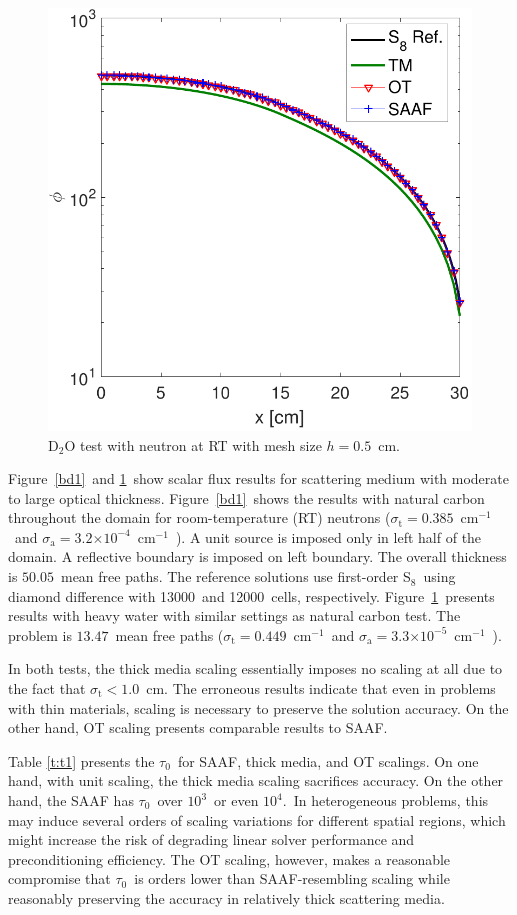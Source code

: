 \documentclass[review]{elsarticle}
\newcommand{\st}{\sigma_\mathrm{t}}
\newcommand{\e}[1]{\ensuremath{\times 10^{#1}}}
\newcommand{\siga}{\sigma_\mathrm{a}}
\newcommand{\icm}{cm$^{-1}$}
\begin{document}
\begin{figure}[ht!]
	\centering
	\hspace*{0cm}\includegraphics[width=.75\linewidth]{PHY_D2O.pdf}
	\caption{D$_2$O test with neutron at RT {with mesh size $h=0.5$\ cm}.}
	\label{bd2}
\end{figure}

Figure\ \ref{bd1}\ and \ref{bd2}\ {show scalar flux results for} scattering medium with moderate to large optical thickness. Figure\ \ref{bd1}\ shows the results with natural carbon throughout the domain for room-temperature (RT) neutrons ($\st=0.385$\ \icm\ and $\siga=3.2\e{-4}$\ \icm\ \cite{xie_book}). A unit source is imposed only in left half of the domain. A reflective boundary is imposed on left boundary. The overall thickness is {$50.05$}\ mean free paths. The reference solutions use  first-order S$_8$\ using diamond difference with 13000\ and 12000\ cells, respectively. Figure\ \ref{bd2}\ presents results with heavy water with similar settings as natural carbon test. The problem is {$13.47$}\ mean free paths ($\st=0.449$\ \icm\ and $\siga=3.3\e{-5}$\ \icm\ \cite{xie_book}). 

In both tests, the thick media scaling essentially imposes no scaling at all due to the fact that $\st<1.0$\ cm. The erroneous results indicate that even in problems with thin materials, scaling is necessary to preserve the solution accuracy. On the other hand, OT scaling presents comparable results to SAAF. 

Table \ref{t:t1} presents the $\tau_0$\ for SAAF, thick media, and OT scalings. On one hand, with unit scaling, the thick media scaling sacrifices accuracy. On the other hand, the SAAF has $\tau_0$\ over $10^3$\ or even $10^4$.\ In heterogeneous problems, this may induce several orders of scaling variations for different spatial regions, which might increase the risk of degrading linear solver performance and preconditioning efficiency. The OT scaling, however, makes a reasonable compromise that $\tau_0$\ is orders lower than SAAF-resembling scaling while reasonably preserving the accuracy in relatively thick scattering media.
\end{document}
